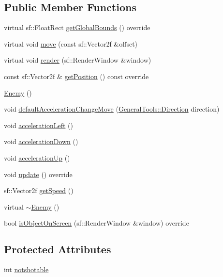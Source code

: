 \subsection*{Public Member Functions}
\begin{DoxyCompactItemize}
\item 
virtual sf\+::\+Float\+Rect \hyperlink{class_enemy_abb50439b9517d5a2b4c6b6c6a4e91672}{get\+Global\+Bounds} () override
\item 
virtual void \hyperlink{class_enemy_a4db256c45aa8d835561e035969883069}{move} (const sf\+::\+Vector2f \&offset)
\item 
virtual void \hyperlink{class_enemy_a409d7d48e2f6bb27f878691f14a79957}{render} (sf\+::\+Render\+Window \&window)
\item 
const sf\+::\+Vector2f \& \hyperlink{class_enemy_ade0ec5d0a52a35a387a4cdcccf4c9ddc}{get\+Position} () const override
\item 
\hyperlink{class_enemy_a94f30d348b6d2840fd71675472ba38dd}{Enemy} ()
\item 
void \hyperlink{class_enemy_ae642ab230b9b416142cfe2a6ed3e3aeb}{default\+Acceleration\+Change\+Move} (\hyperlink{namespace_general_tools_afedc3bd242369903830dec92c3ad569b}{General\+Tools\+::\+Direction} direction)
\item 
void \hyperlink{class_enemy_a842ae08ff3a191b3bfd5a0f865b968be}{acceleration\+Left} ()
\item 
void \hyperlink{class_enemy_a901af192d36d757b0cfbd2c92c742ccc}{acceleration\+Down} ()
\item 
void \hyperlink{class_enemy_acb3226b1c27efc097b3817a8efde1e93}{acceleration\+Up} ()
\item 
void \hyperlink{class_enemy_aa70d742da02995011f1618acc9e303db}{update} () override
\item 
sf\+::\+Vector2f \hyperlink{class_enemy_a8c53ca8541fdfc43b8464feeabefc150}{get\+Speed} ()
\item 
virtual \hyperlink{class_enemy_ac0eec4755e28c02688065f9657150ac3}{$\sim$\+Enemy} ()
\item 
bool \hyperlink{class_enemy_a9a6b7416616b3d0464978d38cf7095e9}{is\+Object\+On\+Screen} (sf\+::\+Render\+Window \&window) override
\end{DoxyCompactItemize}
\subsection*{Protected Attributes}
\begin{DoxyCompactItemize}
\item 
int \hyperlink{class_enemy_a330c49a49d5c017292a6ab66678f853a}{notshotable}
\end{DoxyCompactItemize}
